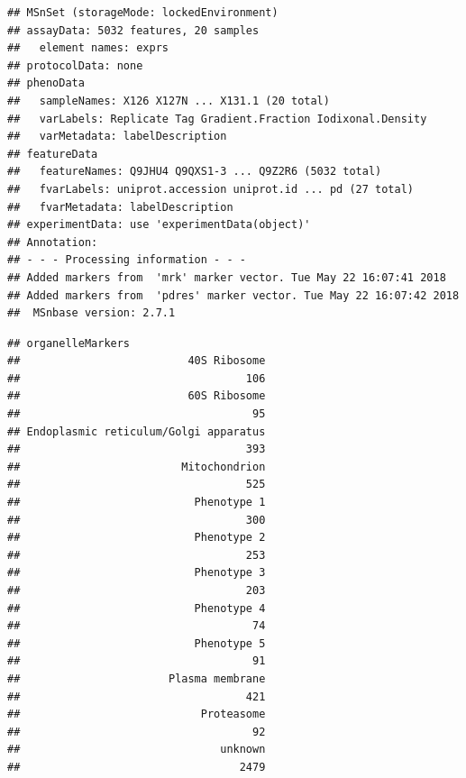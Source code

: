 \begin{knitrout}
\color{fgcolor}\begin{kframe}
\begin{alltt}
\end{alltt}
\begin{verbatim}
## MSnSet (storageMode: lockedEnvironment)
## assayData: 5032 features, 20 samples 
##   element names: exprs 
## protocolData: none
## phenoData
##   sampleNames: X126 X127N ... X131.1 (20 total)
##   varLabels: Replicate Tag Gradient.Fraction Iodixonal.Density
##   varMetadata: labelDescription
## featureData
##   featureNames: Q9JHU4 Q9QXS1-3 ... Q9Z2R6 (5032 total)
##   fvarLabels: uniprot.accession uniprot.id ... pd (27 total)
##   fvarMetadata: labelDescription
## experimentData: use 'experimentData(object)'
## Annotation:  
## - - - Processing information - - -
## Added markers from  'mrk' marker vector. Tue May 22 16:07:41 2018 
## Added markers from  'pdres' marker vector. Tue May 22 16:07:42 2018 
##  MSnbase version: 2.7.1
\end{verbatim}
\begin{alltt}
  \hlstd{=} \hlstd{)}
\end{alltt}
\begin{verbatim}
## organelleMarkers
##                          40S Ribosome 
##                                   106 
##                          60S Ribosome 
##                                    95 
## Endoplasmic reticulum/Golgi apparatus 
##                                   393 
##                         Mitochondrion 
##                                   525 
##                           Phenotype 1 
##                                   300 
##                           Phenotype 2 
##                                   253 
##                           Phenotype 3 
##                                   203 
##                           Phenotype 4 
##                                    74 
##                           Phenotype 5 
##                                    91 
##                       Plasma membrane 
##                                   421 
##                            Proteasome 
##                                    92 
##                               unknown 
##                                  2479
\end{verbatim}
\end{kframe}
\end{knitrout}

